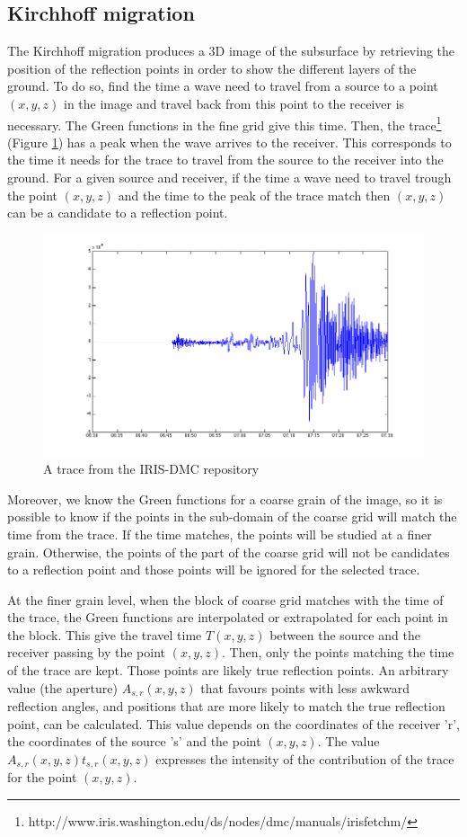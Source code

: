 \subsection{Kirchhoff migration \label{sec:kirchhoff}}
The Kirchhoff migration produces a 3D image of the subsurface by retrieving the position of the reflection points in order to show the different layers of the ground.
To do so, find the time a wave need to travel from a source to a point $(x,y,z)$ in the image and travel back from this point to the receiver is necessary.
The Green functions in the fine grid give this time.
Then, the trace\footnote{http://www.iris.washington.edu/ds/nodes/dmc/manuals/irisfetchm/} (Figure \ref{fig:kir_trace}) has a peak when the wave arrives to the receiver.
This corresponds to the time it needs for the trace to travel from the source to the receiver into the ground.
For a given source and receiver, if the time a wave need to travel trough the point $(x,y,z)$ and the time to the peak of the trace match then $(x,y,z)$ can be a candidate to a reflection point.

\begin{figure}[H]
	\centering
	\includegraphics[width=.75\textwidth]{trace}
	\caption{A trace from the IRIS-DMC repository\label{fig:kir_trace}}
\end{figure}

Moreover, we know the Green functions for a coarse grain of the image, so it is possible to know if the points in the sub-domain of the coarse grid will match the time from the trace.
If the time matches, the points will be studied at a finer grain.
Otherwise, the points of the part of the coarse grid will not be candidates to a reflection point and those points will be ignored for the selected trace.

At the finer grain level, when the block of coarse grid matches with the time of the trace, the Green functions are interpolated or extrapolated for each point in the block.
This give the travel time $T(x,y,z)$ between the source and the receiver passing by the point $(x,y,z)$.
Then, only the points matching the time of the trace are kept.
Those points are likely true reflection points.
An arbitrary value (the aperture) $A_{s,r}(x,y,z)$  \cite{XHCCC2014} that favours points with less awkward reflection angles, and positions that are more likely to match the true reflection point, can be calculated.
This value depends on the coordinates of the receiver 'r', the coordinates of the source 's' and the point $(x,y,z)$.
The value $A_{s,r}(x,y,z) t_{s,r}(x,y,z)$ expresses the intensity of the contribution of the trace for the point $(x,y,z)$.

